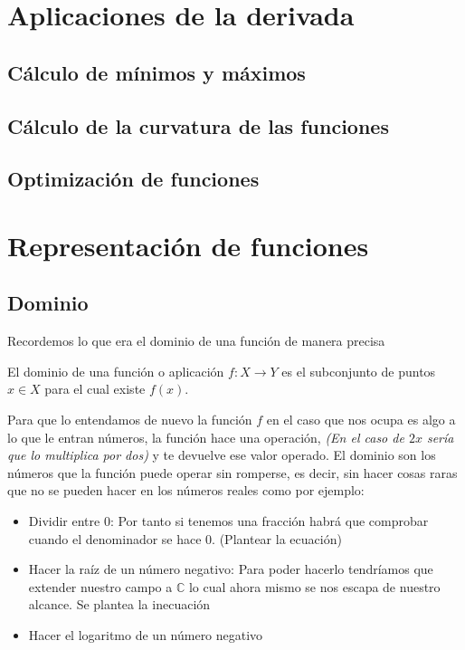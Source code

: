 \chapter{Aplicaciones de la derivada}
\minitoc

\newpage
\section{Cálculo de mínimos y máximos}
\section{Cálculo de la curvatura de las funciones}
\section{Optimización de funciones}






\chapter{Representación de funciones}
\minitoc

\newpage
\section{Dominio}
Recordemos lo que era el dominio de una función de manera precisa
\begin{defi}
El dominio de una función o aplicación $f: X\longrightarrow Y$ es el subconjunto de puntos $x \in X$ para el cual existe $f(x)$. 
\end{defi}
\noindent
Para que lo entendamos de nuevo la función $f$ en el caso que nos ocupa es algo a lo que le entran números, la función hace una operación, \emph{(En el caso de $2x$ sería que lo multiplica por dos)} y te devuelve ese valor operado. 
\noindent
El dominio son los números que la función puede operar sin  romperse, es decir, sin hacer cosas raras que no se pueden hacer en los números reales como por ejemplo:
\begin{itemize}
\item Dividir entre 0: Por tanto si tenemos una fracción habrá que comprobar cuando el denominador se hace 0. (Plantear la ecuación)
\item Hacer la raíz de un número negativo: Para poder hacerlo tendríamos que extender nuestro campo a $\mathbb{C}$ lo cual ahora mismo se nos escapa de nuestro alcance. Se plantea la inecuación
\item Hacer el logaritmo de un número negativo 
\end{itemize}

